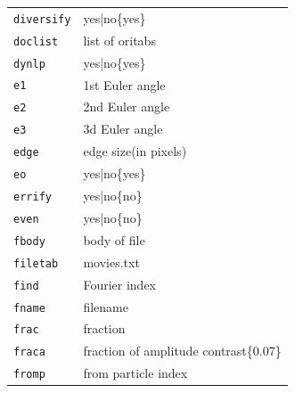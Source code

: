 \documentclass[a4paper,11pt]{article}
\begin{document}
\begin{tabular}{ll}
\texttt{diversify}&{yes|no\{yes\}}\\
\texttt{doclist}&{list of oritabs}\\
\texttt{dynlp}&{yes|no\{yes\}}\\
\texttt{e1}&{1st Euler angle}\\
\texttt{e2}&{2nd Euler angle}\\
\texttt{e3}&{3d Euler angle}\\
\texttt{edge}&{edge size(in pixels)}\\
\texttt{eo}&{yes|no\{yes\}}\\
\texttt{errify}&{yes|no\{no\}}\\
\texttt{even}&{yes|no\{no\}}\\
\texttt{fbody}&{body of file}\\
\texttt{filetab}&{movies.txt}\\
\texttt{find}&{Fourier index}\\
\texttt{fname}&{filename}\\
\texttt{frac}&{fraction}\\
\texttt{fraca}&{fraction of amplitude contrast\{0.07\}}\\
\texttt{fromp}&{from particle index}\\
\end{tabular}
\end{document}
